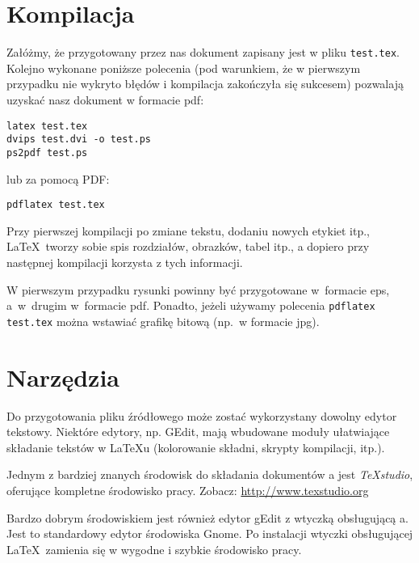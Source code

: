 
\section{Kompilacja}\label{sec:kompilacja}


Załóżmy, że przygotowany przez nas dokument zapisany jest w pliku \texttt{test.tex}. Kolejno wykonane poniższe polecenia (pod warunkiem, że w pierwszym przypadku nie wykryto błędów i kompilacja zakończyła się sukcesem) pozwalają uzyskać nasz dokument w formacie pdf:
\begin{lstlisting}
latex test.tex
dvips test.dvi -o test.ps
ps2pdf test.ps
\end{lstlisting}
%
lub za pomocą PDF\LateX:
\begin{lstlisting}
pdflatex test.tex
\end{lstlisting}

Przy pierwszej kompilacji po zmiane tekstu, dodaniu nowych etykiet itp., \LaTeX\ tworzy sobie spis rozdziałów, obrazków, tabel itp., a dopiero przy następnej kompilacji korzysta z tych informacji.

W pierwszym przypadku rysunki powinny być przygotowane w~formacie eps, a~w~drugim w~formacie pdf. Ponadto, jeżeli używamy polecenia \texttt{pdflatex test.tex} można wstawiać grafikę bitową (np.\ w formacie jpg).




\section{Narzędzia}\label{sec:narzedzia}


Do przygotowania pliku źródłowego może zostać wykorzystany dowolny edytor tekstowy. Niektóre edytory, np. GEdit, mają wbudowane moduły ułatwiające składanie tekstów w LaTeXu (kolorowanie składni, skrypty kompilacji, itp.).

Jednym z bardziej znanych środowisk do składania dokumentów  \LateX a jest {\em TeXstudio}, oferujące kompletne środowisko pracy. Zobacz: \url{http://www.texstudio.org} %


Bardzo dobrym środowiskiem jest również edytor gEdit z wtyczką obsługującą \LateX a. Jest to standardowy edytor środowiska Gnome. Po instalacji wtyczki obsługującej \LaTeX\ zamienia się w wygodne i szybkie środowisko pracy. %

